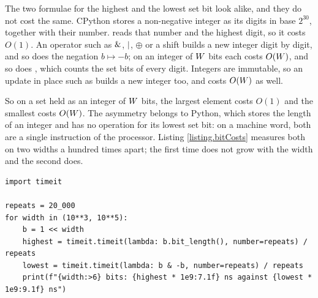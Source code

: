 The two formulae for the highest and the lowest set bit look alike,
and they do not cost the same.
CPython stores a non-negative integer as its digits in base $2^{30}$,
together with their number.
 reads that number and the highest digit, so it costs $O(1)$.
An operator such as $\mathbin{\&}$, $\mathbin{|}$, $\oplus$ or a shift builds a new integer digit by
digit, and so does the negation $b \mapsto -b$;
on an integer of $W$ bits each costs $O(W)$,
and so does , which counts the set bits of every digit.
Integers are immutable, so an update in place such as  builds a new integer
too, and costs $O(W)$ as well.

So on a set held as an integer of $W$ bits,
the largest element costs $O(1)$ and the smallest costs $O(W)$.
The asymmetry belongs to Python,
which stores the length of an integer and has no operation for its lowest set bit:
on a machine word, both are a single instruction of the processor.
Listing \ref{listing.bitCosts} measures both on two widths a hundred times apart;
the first time does not grow with the width and the second does.

\begin{lstlisting}[caption={The highest set bit against the lowest, on two widths.}, label=listing.bitCosts]
import timeit

repeats = 20_000
for width in (10**3, 10**5):
    b = 1 << width
    highest = timeit.timeit(lambda: b.bit_length(), number=repeats) / repeats
    lowest = timeit.timeit(lambda: b & -b, number=repeats) / repeats
    print(f"{width:>6} bits: {highest * 1e9:7.1f} ns against {lowest * 1e9:9.1f} ns")
\end{lstlisting}
